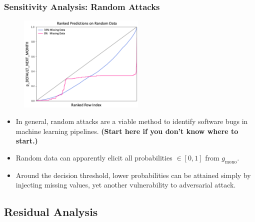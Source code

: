 \documentclass[11pt,
               aspectratio=43,
               hyperref={colorlinks}
               ]{beamer}
\begin{document}
			\begin{frame}[t]
		
		
				\frametitle{\textbf{Sensitivity Analysis}: Random Attacks}
				\vspace{-15pt}
				\begin{figure}
					\begin{center}
						\includegraphics[height=130pt]{img/ra.png}
					\end{center}
				\end{figure}	
				\vspace{-10pt}
				\begin{itemize}\scriptsize
					\item In general, random attacks are a viable method to identify software bugs in machine learning pipelines. \textbf{(Start here if you don't know where to start.)}
					\item Random data can apparently elicit all probabilities $\in [0, 1]$ from $g_{\text{mono}}$.
					\item Around the decision threshold, lower probabilities can be attained simply by injecting missing values, yet another vulnerability to adversarial attack.
				\end{itemize}
				\normalsize
		
			\end{frame}
			
		\subsection{Residual Analysis}
\end{document}
